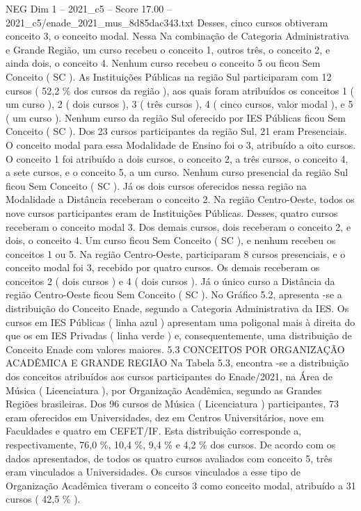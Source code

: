 \begin{textsample}{NEG Dim 1 – 2021\_c5 – Score 17.00 – 2021\_c5/enade\_2021\_mus\_8d85dac343.txt}
Desses, cinco cursos obtiveram conceito 3, o conceito modal.
Nessa Na combinação de Categoria Administrativa e Grande Região, um curso recebeu o conceito 1, outros três, o conceito 2, e ainda dois, o conceito 4.
Nenhum curso recebeu o conceito 5 ou ficou Sem Conceito ( SC ).
As Instituições Públicas na região Sul participaram com 12 cursos ( 52,2 \% dos cursos da região ), aos quais foram atribuídos os conceitos 1 ( um curso ), 2 ( dois cursos ), 3 ( três cursos ), 4 ( cinco cursos, valor modal ), e 5 ( um curso ).
Nenhum curso da região Sul oferecido por IES Públicas ficou Sem Conceito ( SC ).
Dos 23 cursos participantes da região Sul, 21 eram Presenciais.
O conceito modal para essa Modalidade de Ensino foi o 3, atribuído a oito cursos.
O conceito 1 foi atribuído a dois cursos, o conceito 2, a três cursos, o conceito 4, a sete cursos, e o conceito 5, a um curso.
Nenhum curso presencial da região Sul ficou Sem Conceito ( SC ).
Já os dois cursos oferecidos nessa região na Modalidade a Distância receberam o conceito 2.
Na região Centro-Oeste, todos os nove cursos participantes eram de Instituições Públicas.
Desses, quatro cursos receberam o conceito modal 3.
Dos demais cursos, dois receberam o conceito 2, e dois, o conceito 4.
Um curso ficou Sem Conceito ( SC ), e nenhum recebeu os conceitos 1 ou 5.
Na região Centro-Oeste, participaram 8 cursos presenciais, e o conceito modal foi 3, recebido por quatro cursos.
Os demais receberam os conceitos 2 ( dois cursos ) e 4 ( dois cursos ).
Já o único curso a Distância da região Centro-Oeste ficou Sem Conceito ( SC ).
No Gráfico 5.2, apresenta -se a distribuição do Conceito Enade, segundo a Categoria Administrativa da IES.
Os cursos em IES Públicas ( linha azul ) apresentam uma poligonal mais à direita do que os em IES Privadas ( linha verde ) e, consequentemente, uma distribuição de Conceito Enade com valores maiores. 5.3 CONCEITOS POR ORGANIZAÇÃO ACADÊMICA E GRANDE REGIÃO Na Tabela 5.3, encontra -se a distribuição dos conceitos atribuídos aos cursos participantes do Enade/2021, na Área de Música ( Licenciatura ), por Organização Acadêmica, segundo as Grandes Regiões brasileiras.
Dos 96 cursos de Música ( Licenciatura ) participantes, 73 eram oferecidos em Universidades, dez em Centros Universitários, nove em Faculdades e quatro em CEFET/IF.
Esta distribuição corresponde a, respectivamente, 76,0 \%, 10,4 \%, 9,4 \% e 4,2 \% dos cursos.
De acordo com os dados apresentados, de todos os quatro cursos avaliados com conceito 5, três eram vinculados a Universidades.
Os cursos vinculados a esse tipo de Organização Acadêmica tiveram o conceito 3 como conceito modal, atribuído a 31 cursos ( 42,5 \% ).

\end{textsample}
